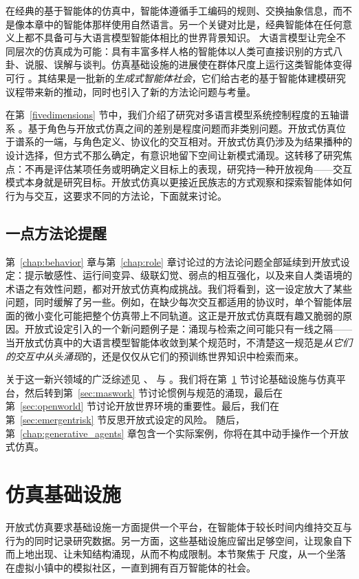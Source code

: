 在经典的基于智能体的仿真中，智能体遵循手工编码的规则、交换抽象信息，而不是像本章中的智能体那样使用自然语言。另一个关键对比是，经典智能体在任何意义上都不具备可与大语言模型智能体相比的世界背景知识。%
大语言模型让完全不同层次的仿真成为可能：具有丰富多样人格的智能体以人类可直接识别的方式八卦、说服、误解与谈判。仿真基础设施的进展使在群体尺度上运行这类智能体变得可行 \citep{gao2024large, yang2024oasis}。其结果是一批新的\emph{生成式智能体社会}，它们给古老的基于智能体建模研究议程带来新的推动，同时也引入了新的方法论问题与考量。

在第~\ref{fivedimensions} 节中，我们介绍了研究对多语言模型系统控制程度的五轴谱系 \citep{tran2025multi}。基于角色与开放式仿真之间的差别是程度问题而非类别问题。开放式仿真位于谱系的一端，与角色定义、协议化的交互相对。开放式仿真仍涉及为结果播种的设计选择，但方式不那么确定，有意识地留下空间让新模式涌现。这转移了研究焦点：不再是评估某项任务或明确定义目标上的表现，研究持一种开放视角——交互模式本身就是研究目标。开放式仿真以更接近民族志的方式观察和探索智能体如何行为与交互，这要求不同的方法论，下面就来讨论。

\subsection{一点方法论提醒} \label{sec:meth-emergent}
第~\ref{chap:behavior} 章与第~\ref{chap:role} 章讨论过的方法论问题全部延续到开放式设定：提示敏感性、运行间变异、级联幻觉、弱点的相互强化，以及来自人类语境的术语之有效性问题，都对开放式仿真构成挑战。我们将看到，这一设定放大了某些问题，同时缓解了另一些。例如，在缺少每次交互都适用的协议时，单个智能体层面的微小变化可能把整个仿真带上不同轨道。这正是开放式仿真既有趣又脆弱的原因。开放式设定引入的一个新问题例子是：涌现与检索之间可能只有一线之隔——当开放式仿真中的大语言模型智能体收敛到某个规范时，不清楚这一规范是\emph{从它们的交互中从头涌现}的，还是仅仅从它们的预训练世界知识中检索而来。

关于这一新兴领域的广泛综述见 \citet{mou2024individual}、\citet{savarimuthu2024harnessing} 与 \citet{xi2023rise}。我们将在第~\ref{sec:emergentinfra} 节讨论基础设施与仿真平台，然后转到第~\ref{sec:maswork} 节讨论惯例与规范的涌现，最后在第~\ref{sec:openworld} 节讨论开放世界环境的重要性。最后，我们在第~\ref{sec:emergentrisk} 节反思开放式设定的风险。
随后，第~\ref{chap:generative_agents} 章包含一个实际案例，你将在其中动手操作一个开放式仿真。


\section{仿真基础设施} \label{sec:emergentinfra}
开放式仿真要求基础设施一方面提供一个平台，在智能体于较长时间内维持交互与行为的同时记录研究数据。另一方面，这些基础设施应留出足够空间，让现象自下而上地出现、让未知结构涌现，从而不构成限制。本节聚焦于%
尺度，从一个坐落在虚拟小镇中的模拟社区，一直到拥有百万智能体的社会。

